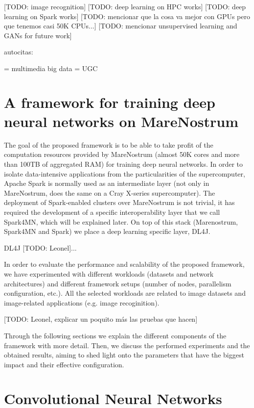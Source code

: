 \documentclass[journal]{IEEEtran}
\begin{document}
[TODO: image recognition]
[TODO: deep learning on HPC works]
[TODO: deep learning on Spark works]
[TODO: mencionar que la cosa va mejor con GPUs pero que tenemos casi 50K CPUs...]
[TODO: mencionar unsupervised learning and GANs for future work]


autocitas:

\cite{conf/bigmm/TousTA15} = multimedia big data
\cite{conf/bigdataconf/Tous16} = UGC


\section{A framework for training deep neural networks on MareNostrum}
\label{sec:framework}

The goal of the proposed framework is to be able to take profit of the computation resources provided by MareNostrum (almost 50K cores and more than 100TB of aggregated RAM) for training deep neural networks. In order to isolate data-intensive applications from the particularities of the supercomputer, Apache Spark is normally used as an intermediate layer (not only in MareNostrum, \cite{wang2014} does the same on a Cray X-series supercomputer). The deployment of Spark-enabled clusters over MareNostrum is not trivial, it has required the development of a specific interoperability layer that we call Spark4MN, which will be explained later. On top of this stack (Marenostrum, Spark4MN and Spark) we place a deep learning specific layer, DL4J. 

DL4J [TODO: Leonel]...

In order to evaluate the performance and scalability of the proposed framework, we have experimented with different workloads (datasets and network architectures) and different framework setups (number of nodes, parallelism configuration, etc.). All the selected workloads are related to image datasets and image-related applications (e.g. image recoginition). 

[TODO: Leonel, explicar un poquito más las pruebas que hacen]

Through the following sections we explain the different components of the framework with more detail. Then, we discuss the performed experiments and the obtained results, aiming to shed light onto the parameters that have the biggest impact and their effective configuration.

\section{Convolutional Neural Networks}
\label{sec:spark}
\end{document}
